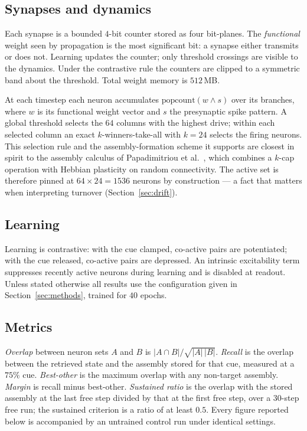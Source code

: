 \documentclass[10pt,twocolumn,a4paper]{article}
\newcommand{\pct}{\%}
\begin{document}
\subsection{Synapses and dynamics}
Each synapse is a bounded $4$-bit counter stored as four bit-planes. The \emph{functional}
weight seen by propagation is the most significant bit: a synapse either transmits or does
not. Learning updates the counter; only threshold crossings are visible to the dynamics.
Under the contrastive rule the counters are clipped to a symmetric band about the
threshold. Total weight memory is $512$\,MB.

At each timestep each neuron accumulates $\mathrm{popcount}(w \wedge s)$ over its
branches, where $w$ is its functional weight vector and $s$ the presynaptic spike pattern.
A global threshold selects the $64$ columns with the highest drive; within each selected
column an exact $k$-winners-take-all with $k=24$ selects the firing neurons. This
selection rule and the assembly-formation scheme it supports are closest in spirit to the
assembly calculus of Papadimitriou et al.\ \cite{papadimitriou2020}, which combines a
$k$-cap operation with Hebbian plasticity on random connectivity. The active set is
therefore pinned at $64\times24 = 1536$ neurons by construction --- a fact that matters
when interpreting turnover (Section~\ref{sec:drift}).

\subsection{Learning}
Learning is contrastive: with the cue clamped, co-active pairs are potentiated; with the
cue released, co-active pairs are depressed. An intrinsic excitability term suppresses
recently active neurons during learning and is disabled at readout. Unless stated
otherwise all results use the configuration given in Section~\ref{sec:methods}, trained
for $40$ epochs.

\subsection{Metrics}
\emph{Overlap} between neuron sets $A$ and $B$ is $|A\cap B|/\sqrt{|A|\,|B|}$.
\emph{Recall} is the overlap between the retrieved state and the assembly stored for that
cue, measured at a $75\pct$ cue. \emph{Best-other} is the maximum overlap with any
non-target assembly. \emph{Margin} is recall minus best-other. \emph{Sustained ratio} is
the overlap with the stored assembly at the last free step divided by that at the first
free step, over a $30$-step free run; the sustained criterion is a ratio of at least
$0.5$. Every figure reported below is accompanied by an untrained control run under
identical settings.
\end{document}
